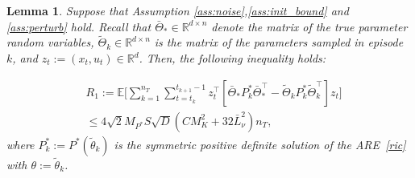 \documentclass[11pt]{article}
\theoremstyle{plain}
\newtheorem{lem}[thm]{Lemma}
\theoremstyle{definition}
\theoremstyle{remark}
\begin{document}
\begin{lem}\label{lem:r1}
Suppose that Assumption \ref{ass:noise},\ref{ass:init_bound} and \ref{ass:perturb} hold.
Recall that $\bar{\Theta}_* \in \mathbb{R}^{d \times n}$ denote the 
matrix of the true parameter random variables, $\tilde{\Theta}_k  \in \mathbb{R}^{d \times n}$ is the matrix of the parameters sampled in episode $k$, and $z_t := (x_t, u_t) \in \mathbb{R}^d$.
Then, the following inequality holds:

\begin{equation}\nonumber
\begin{split}
&R_1:= \mathbb{E}\bigg[
\sum_{k=1}^{n_T} \sum_{t=t_k}^{t_{k+1} - 1} z_t^\top [
\bar{\Theta}_*  P^*_k  \bar{\Theta}_*^\top
- \tilde{\Theta}_k P^*_k \tilde{\Theta}_k^\top 
]z_t
\bigg ]\\
& \leq 4\sqrt{2}M_{P^*} S\sqrt{D}(C M_K^2+32\bar{L}_{\nu}^2) n_T,
\end{split}
\end{equation}
where $P^*_k := P^*(\tilde{\theta}_k)$ is the symmetric positive definite solution of the ARE~\eqref{ric} with $\theta := \tilde{\theta}_k$.
\end{lem}
\end{document}
